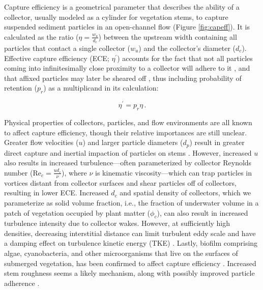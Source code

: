 \documentclass[geosciences,article,submit,moreauthors,pdftex]{Definitions/mdpi}
\newcommand\Rey{\mathrm{Re}}
\begin{document}
Capture efficiency is a geometrical parameter that describes the ability of a collector, usually modeled as a cylinder for vegetation stems, to capture suspended sediment particles in an open-channel flow (Figure \ref{fig:capeff}). It is calculated as the ratio ($\eta=\frac{w_u}{d_c}$) between the upstream width containing all particles that contact a single collector ($w_u$) and the collector's diameter ($d_c$). Effective capture efficiency (ECE; $\eta^\prime$) accounts for the fact that not all particles coming into infinitesimally close proximity to a collector will adhere to it \cite{spielman1977particle, wu2012single}, and that affixed particles may later be sheared off \cite{peruzzo2012capillary}, thus including probability of retention ($p_r$) as a multiplicand in its calculation:

\begin{equation}
    \eta^\prime=p_r \eta\,.
    \label{eq:ece}
\end{equation}

Physical properties of collectors, particles, and flow environments are all known to affect capture efficiency, though their relative importances are still unclear. Greater flow velocities ($u$) and larger particle diameters ($d_p$) result in greater direct capture and inertial impaction of particles on stems \cite{Palmer_2004,fuchs1965mechanics}. However, increased $u$ also results in increased turbulence---often parameterized by collector Reynolds number ($\Rey_c=\frac{ud_c}{\nu}$), where $\nu$ is kinematic viscosity---which can trap particles in vortices distant from collector surfaces and shear particles off of collectors, resulting in lower ECE. Increased $d_c$ and spatial density of collectors, which we parameterize as solid volume fraction, i.e., the fraction of underwater volume in a patch of vegetation occupied by plant matter ($\phi_c$), can also result in increased turbulence intensity due to collector wakes. However, at sufficiently high densities, decreasing interstitial distance can limit turbulent eddy scale and have a damping effect on turbulence kinetic energy (TKE) \cite{nepf_drag_1999, leonard1995flow}. Lastly, biofilm comprising algae, cyanobacteria, and other microorganisms that live on the surfaces of submerged vegetation, has been confirmed to affect capture efficiency \cite{Fauria_2015}. Increased stem roughness \cite{Palmer_2004} seems a likely mechanism, along with possibly improved particle adherence \cite{wu2014colloid}.
\end{document}
